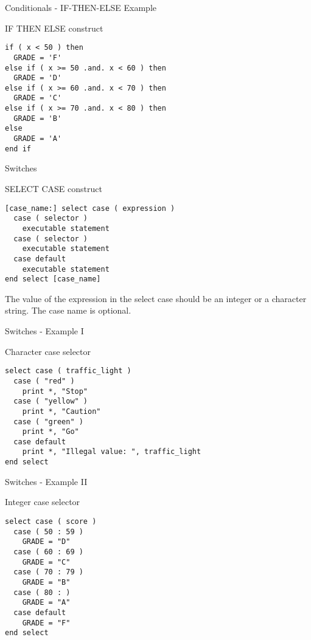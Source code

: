 \begin{frame}[fragile]{Conditionals - IF-THEN-ELSE Example}
\begin{block}{IF THEN ELSE construct}
\begin{lstlisting}
if ( x < 50 ) then
  GRADE = 'F'
else if ( x >= 50 .and. x < 60 ) then
  GRADE = 'D'
else if ( x >= 60 .and. x < 70 ) then
  GRADE = 'C'
else if ( x >= 70 .and. x < 80 ) then
  GRADE = 'B'
else
  GRADE = 'A'
end if
\end{lstlisting}
\end{block}
\end{frame}

\begin{frame}[fragile]{Switches}
\begin{block}{SELECT CASE construct}
\begin{lstlisting}
[case_name:] select case ( expression )
  case ( selector )
    executable statement
  case ( selector )
    executable statement
  case default
    executable statement
end select [case_name]
\end{lstlisting}
\end{block}
The value of the expression in the select case should be an integer or a character string.
The case name is optional.
\end{frame}

\begin{frame}[fragile]{Switches - Example I}
\begin{block}{Character case selector}
\begin{lstlisting}
select case ( traffic_light )
  case ( "red" )
    print *, "Stop"
  case ( "yellow" )
    print *, "Caution"
  case ( "green" )
    print *, "Go"
  case default
    print *, "Illegal value: ", traffic_light
end select
\end{lstlisting}
\end{block}
\end{frame}

\begin{frame}[fragile]{Switches - Example II}
\begin{block}{Integer case selector}
\begin{lstlisting}
select case ( score )
  case ( 50 : 59 )
    GRADE = "D"
  case ( 60 : 69 )
    GRADE = "C"
  case ( 70 : 79 )
    GRADE = "B"
  case ( 80 : )
    GRADE = "A"
  case default
    GRADE = "F"
end select
\end{lstlisting}
\end{block}
\end{frame}


